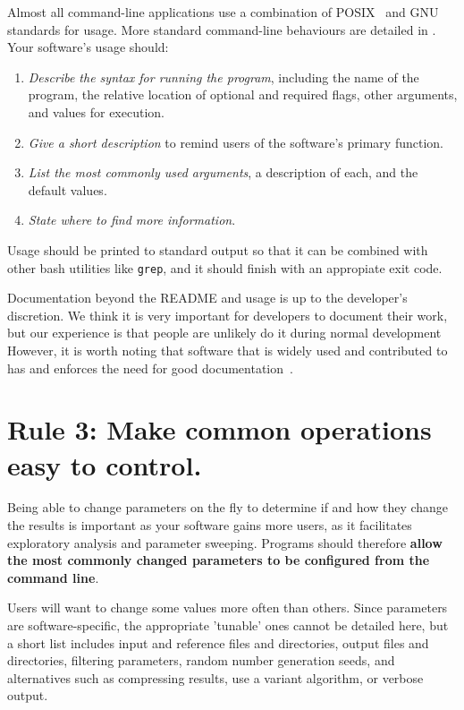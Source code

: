 \documentclass[10pt,letterpaper]{article}
\newcommand{\rulemajor}[1]{\section{#1}}
\newcommand{\ruleminor}[1]{\textbf{#1}}
\begin{document}
{Almost all command-line applications use a combination of
POSIX~\cite{posix2016} and GNU~\cite{gnustandards} standards for usage.
More standard command-line behaviours are detailed in \cite{Seemann2013}.
Your software's usage should:

\begin{enumerate}

\item \textit{Describe the syntax for running the program}, including the
  name of the program, the relative location of optional
  and required flags, other arguments, and values for execution.

\item \textit{Give a short description} to remind users of the software's primary function.

\item \textit{List the most commonly used arguments}, a description of each, and
    the default values.

\item \textit{State where to find more information}.

\end{enumerate}

Usage should be
printed to standard output so that it can be
combined with other bash utilities like \texttt{grep},
and it should finish with an appropiate exit code.

Documentation beyond the README and usage is up to the developer's discretion.
We think it is very important for developers to document their work, but our
experience is that people are unlikely do it during normal development
However, it
is worth noting that software that is widely used and contributed to has and
enforces the need for good documentation~\cite{gentleman2004}.}

\rulemajor{Rule 3: Make common operations easy to control.}

Being able to change parameters on the fly to determine if and how
they change the results is important as your software gains more users,
as it facilitates exploratory analysis and parameter sweeping.
Programs should therefore
\ruleminor{allow the most commonly changed parameters to be configured from the command line}.

Users will want to change some values more often than others.
Since parameters are software-specific, the appropriate 'tunable' ones cannot be detailed here,
but a short list includes input and reference files and directories,
output files and directories,
filtering parameters,
random number generation seeds,
and
alternatives such as compressing results,
use a variant algorithm,
or verbose output.
\end{document}
